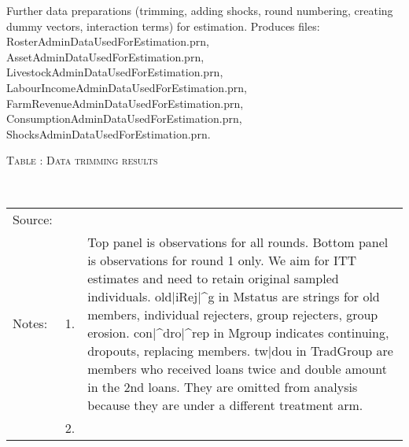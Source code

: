 Further data preparations (trimming, adding shocks, round numbering, creating dummy vectors, interaction terms) for estimation. Produces files: \textsf{\footnotesize RosterAdminDataUsedForEstimation.prn, AssetAdminDataUsedForEstimation.prn, LivestockAdminDataUsedForEstimation.prn, LabourIncomeAdminDataUsedForEstimation.prn, FarmRevenueAdminDataUsedForEstimation.prn, ConsumptionAdminDataUsedForEstimation.prn, ShocksAdminDataUsedForEstimation.prn}.

\hspace{-1cm}\begin{minipage}[t]{14cm}
\hfil\textsc{\normalsize Table \thetable: Data trimming results\label{tab trim}}\\
\setlength{\tabcolsep}{1pt}
\setlength{\baselineskip}{8pt}
\renewcommand{\arraystretch}{.48}
\hfil{}\\
\renewcommand{\arraystretch}{.8}
\setlength{\tabcolsep}{1pt}
\begin{tabular}{>{\hfill\scriptsize}p{1cm}<{}>{\hfill\scriptsize}p{.25cm}<{}>{\scriptsize}p{12cm}<{\hfill}}
Source:& \multicolumn{2}{l}{\scriptsize GUK survey data.}\\
Notes: & 1. & Top panel is observations for all rounds. Bottom panel is observations for round 1 only. We aim for ITT estimates and need to retain original sampled individuals. old$|$iRej$|$\^{}g in \textsf{Mstatus} are strings for old members, individual rejecters, group rejecters, group erosion. con$|$\^{}dro$|$\^{}rep in \textsf{Mgroup} indicates continuing, dropouts, replacing members. tw$|$dou in \textsf{TradGroup} are members who received loans twice and double amount in the 2nd loans. They are omitted from analysis because they are under a different treatment arm.\\
& 2. & 
\end{tabular}
\end{minipage}

